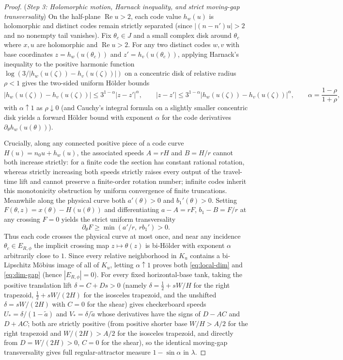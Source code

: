 \documentclass[11pt,reqno]{amsart}
\theoremstyle{definition}
\theoremstyle{remark}
\begin{document}
\begin{proof}
(\emph{Step 3: Holomorphic motion, Harnack inequality, and strict moving-gap transversality}) On the half-plane $\operatorname{Re} u > 2$, each code value $h_w(u)$ is holomorphic and distinct codes remain strictly separated (since $|(n-n')u| > 2$ and no nonempty tail vanishes). Fix $\theta_c \in J$ and a small complex disk around $\theta_c$ where $x, u$ are holomorphic and $\operatorname{Re} u > 2$. For any two distinct codes $w, v$ with base coordinates $z = h_w(u(\theta_c))$ and $z' = h_v(u(\theta_c))$, applying Harnack's inequality to the positive harmonic function $\log(3/|h_w(u(\zeta)) - h_v(u(\zeta))|)$ on a concentric disk of relative radius $\rho < 1$ gives the two-sided uniform H\"older bounds
\[
  |h_w(u(\zeta)) - h_v(u(\zeta))| \le 3^{1-\alpha}|z - z'|^\alpha, \qquad
  |z - z'| \le 3^{1-\alpha}|h_w(u(\zeta)) - h_v(u(\zeta))|^\alpha, \qquad \alpha = \frac{1-\rho}{1+\rho},
\]
with $\alpha \uparrow 1$ as $\rho \downarrow 0$ (and Cauchy's integral formula on a slightly smaller concentric disk yields a forward H\"older bound with exponent $\alpha$ for the code derivatives $\partial_\theta h_w(u(\theta))$).

Crucially, along any connected positive piece of a code curve $H(u) = n_0 u + h_w(u)$, the associated speeds $A = r H$ and $B = H/r$ cannot both increase strictly: for a finite code the section has constant rational rotation, whereas strictly increasing both speeds strictly raises every output of the travel-time lift and cannot preserve a finite-order rotation number; infinite codes inherit this monotonicity obstruction by uniform convergence of finite truncations. Meanwhile along the physical curve both $a'(\theta) > 0$ and $b_1'(\theta) > 0$. Setting $F(\theta, z) = x(\theta) - H(u(\theta))$ and differentiating $a - A = r F$, $b_1 - B = F/r$ at any crossing $F = 0$ yields the strict uniform transversality
\[
  \partial_\theta F \ge \min(a'/r,\, r b_1') > 0.
\]
Thus each code crosses the physical curve at most once, and near any incidence $\theta_c \in E_{R,\phi}$ the implicit crossing map $z \mapsto \theta(z)$ is bi-H\"older with exponent $\alpha$ arbitrarily close to $1$. Since every relative neighborhood in $K_u$ contains a bi-Lipschitz M\"obius image of all of $K_u$, letting $\alpha \uparrow 1$ proves both \eqref{eq:local-dim} and \eqref{eq:dim-gap} (hence $|E_{R,\phi}| = 0$). For every fixed horizontal-base tank, taking the positive translation lift $\delta = C + D s > 0$ (namely $\delta = \frac{1}{2} + sW/H$ for the right trapezoid, $\frac{1}{2} + sW/(2H)$ for the isosceles trapezoid, and the unshifted $\delta = sW/(2H)$ with $C = 0$ for the shear) gives checkerboard speeds $U_* = \delta/(1-\tilde a)$ and $V_* = \delta/\tilde a$ whose derivatives have the signs of $D - AC$ and $D + AC$; both are strictly positive (from positive shorter base $W/H > A/2$ for the right trapezoid and $W/(2H) > A/2$ for the isosceles trapezoid, and directly from $D = W/(2H) > 0$, $C = 0$ for the shear), so the identical moving-gap transversality gives full regular-attractor measure $1 - \sin\alpha$ in $\lambda$.


\end{proof}
\end{document}
